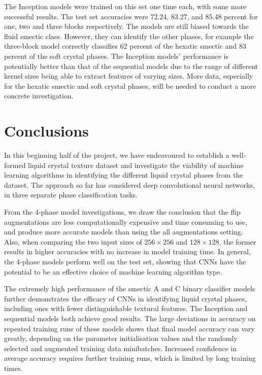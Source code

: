 \documentclass[12pt]{article}
\begin{document}
The Inception models were trained on this set one time each, with some more successful results. The test set accuracies were 72.24, 83.27, and 85.48 percent for one, two and three blocks respectively. The models are still biased towards the fluid smectic class. However, they can identify the other phases, for example the three-block model correctly classifies 62 percent of the hexatic smectic and 83 percent of the soft crystal phases. The Inception models' performance is potentially better than that of the sequential models due to the range of different kernel sizes being able to extract features of varying sizes. More data, especially for the hexatic smectic and soft crystal phases, will be needed to conduct a more concrete investigation.
\section{Conclusions}
In this beginning half of the project, we have endeavoured to establish a well-formed liquid crystal texture dataset and investigate the viability of machine learning algorithms in identifying the different liquid crystal phases from the dataset. The approach so far has considered deep convolutional neural networks, in three separate phase classification tasks. 

From the 4-phase model investigations, we draw the conclusion that the flip augmentations are less computationally expensive and time consuming to use, and produce more accurate models than using the all augmentations setting. Also, when comparing the two input sizes of $256 \times 256$ and $128 \times 128$, the former results in higher accuracies with no increase in model training time. In general, the 4-phase models perform well on the test set, showing that CNNs have the potential to be an effective choice of machine learning algorithm type.

The extremely high performance of the smectic A and C binary classifier models further demonstrates the efficacy of CNNs in identifying liquid crystal phases, including ones with fewer distinguishable textural features. The Inception and sequential models both achieve good results. The large deviations in accuracy on repeated training runs of these models shows that final model accuracy can vary greatly, depending on the parameter initialisation values and the randomly selected and augmented training data minibatches. Increased confidence in average accuracy requires further training runs, which is limited by long training times. 
\end{document}
